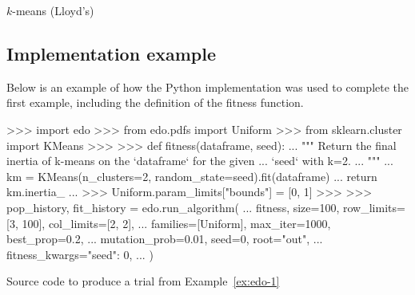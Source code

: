 \balg[H]%

\caption{\(k\)-means (Lloyd's)}
\ealg%

\subsection{Implementation example}\label{app:code}

Below is an example of how the Python implementation was used to complete the
first example, including the definition of the fitness function.

\begin{listing}[htbp]
\begin{usagepy}
>>> import edo
>>> from edo.pdfs import Uniform
>>> from sklearn.cluster import KMeans
>>> 
>>> def fitness(dataframe, seed):
...     """ Return the final inertia of k-means on the `dataframe` for the given
...     `seed` with k=2.
...     """
...     km = KMeans(n_clusters=2, random_state=seed).fit(dataframe)
...     return km.inertia_
... 
>>> Uniform.param_limits["bounds"] = [0, 1]
>>> 
>>> pop_history, fit_history = edo.run_algorithm(
...     fitness, size=100, row_limits=[3, 100], col_limits=[2, 2],
...     families=[Uniform], max_iter=1000, best_prop=0.2,
...     mutation_prob=0.01, seed=0, root="out",
...     fitness_kwargs={"seed": 0},
... )

\end{usagepy}
\caption{Source code to produce a trial from Example~\ref{ex:edo-1}}
\end{listing}
